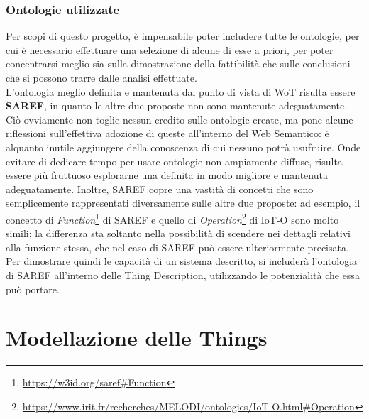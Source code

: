 \documentclass[12pt,a4paper,openright,oneside]{report}
\begin{document}
\subsection{Ontologie utilizzate}
Per scopi di questo progetto, è impensabile poter includere tutte le ontologie, per cui è necessario effettuare una selezione di alcune di esse a priori, per poter concentrarsi meglio sia sulla dimostrazione della fattibilità che sulle conclusioni che si possono trarre dalle analisi effettuate.\\

L'ontologia meglio definita e mantenuta dal punto di vista di WoT risulta essere \textbf{SAREF}, in quanto le altre due proposte non sono mantenute adeguatamente. Ciò ovviamente non toglie nessun credito sulle ontologie create, ma pone alcune riflessioni sull'effettiva adozione di queste all'interno del Web Semantico: è alquanto inutile aggiungere della conoscenza di cui nessuno potrà usufruire. Onde evitare di dedicare tempo per usare ontologie non ampiamente diffuse, risulta essere più fruttuoso esplorarne una definita in modo migliore e mantenuta adeguatamente. Inoltre, SAREF copre una vastità di concetti che sono semplicemente rappresentati diversamente sulle altre due proposte: ad esempio, il concetto di \textit{Function}\footnote{\url{https://w3id.org/saref\#Function}} di SAREF e quello di \textit{Operation}\footnote{\url{https://www.irit.fr/recherches/MELODI/ontologies/IoT-O.html\#Operation}} di IoT-O sono molto simili; la differenza sta soltanto nella possibilità di scendere nei dettagli relativi alla funzione stessa, che nel caso di SAREF può essere ulteriormente precisata.\\

Per dimostrare quindi le capacità di un sistema descritto, si includerà l'ontologia di SAREF all'interno delle Thing Description, utilizzando le potenzialità che essa può portare.\\



\clearpage{\pagestyle{empty}\cleardoublepage}
\chapter{Modellazione delle Things}           %
\lhead[\fancyplain{}{\bfseries\thepage}]{\fancyplain{}{\bfseries\rightmark}}  
\end{document}
